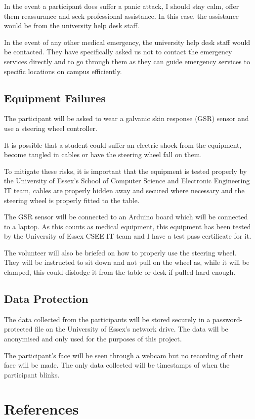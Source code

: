 \documentclass{article}
\begin{document}
In the event a participant does suffer a panic attack, I should stay calm, offer them reassurance and seek professional assistance. In this case, the assistance would be from the university help desk staff.

In the event of any other medical emergency, the university help desk staff would be contacted. They have specifically asked us not to contact the emergency services directly and to go through them as they can guide emergency services to specific locations on campus efficiently.

\subsection{Equipment Failures}

The participant will be asked to wear a galvanic skin response (GSR) sensor and use a steering wheel controller. 

It is possible that a student could suffer an electric shock from the equipment, become tangled in cables or have the steering wheel fall on them.

To mitigate these risks, it is important that the equipment is tested properly by the University of Essex's School of Computer Science and Electronic Engineering IT team, cables are properly hidden away and secured where necessary and the steering wheel is properly fitted to the table.

The GSR sensor will be connected to an Arduino board which will be connected to a laptop. As this counts as medical equipment, this equipment has been tested by the University of Essex CSEE IT team and I have a test pass certificate for it.

The volunteer will also be briefed on how to properly use the steering wheel. They will be instructed to sit down and not pull on the wheel as, while it will be clamped, this could dislodge it from the table or desk if pulled hard enough.

\subsection{Data Protection}

The data collected from the participants will be stored securely in a password-protected file on the University of Essex's network drive. The data will be anonymised and only used for the purposes of this project.

The participant's face will be seen through a webcam but no recording of their face will be made. The only data collected will be timestamps of when the participant blinks.

\section{References}
\end{document}
